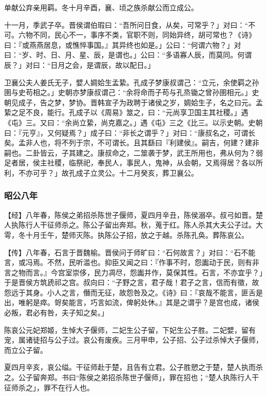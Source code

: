 \documentclass[]{article}
\begin{document}
单献公弃亲用羁。冬十月辛酉，襄、顷之族杀献公而立成公。

十一月，季武子卒。晋侯谓伯瑕曰：``吾所问日食，从矣，可常乎？」对曰：``不可。六物不同，民心不一，事序不类，官职不则，同始异终，胡可常也？《诗》曰：『或燕燕居息，或憔悴事国。』其异终也如是。」公曰：``何谓六物？」对曰：``岁、时、日、月、星、辰，是谓也。」公曰：``多语寡人辰，而莫同。何谓辰？」对曰：``日月之会，是谓辰，故以配日。」

卫襄公夫人姜氏无子，嬖人婤姶生孟絷。孔成子梦康叔谓己：``立元，余使羁之孙圉与史苟相之。」史朝亦梦康叔谓己：``余将命而子苟与孔烝锄之曾孙圉相元。」史朝见成子，告之梦，梦协。晋韩宣子为政聘于诸侯之岁，婤姶生子，名之曰元。孟絷之足不良，能行。孔成子以《周易》筮之，曰：``元尚享卫国主其社稷。」遇《屯》三。又曰：``余尚立絷，尚克嘉之。」遇《屯》三之《比三。以示史朝。史朝曰：『元亨』，又何疑焉？」成子曰：``非长之谓乎？」对曰：``康叔名之，可谓长矣。孟非人也，将不列于宗，不可谓长。且其繇曰『利建侯』。嗣吉，何建？建非嗣也。二卦皆云，子其建之。康叔命之，二筮袭于梦，武王所用也，弗从何为？弱足者居，侯主社稷，临祭祀，奉民人，事民人，鬼神，从会朝，又焉得居？各以所利，不亦可乎？」故孔成子立灵公。十二月癸亥，葬卫襄公。

\hypertarget{header-n2503}{%
\subsubsection{昭公八年}\label{header-n2503}}

【经】八年春，陈侯之弟招杀陈世子偃师，夏四月辛丑，陈侯溺卒。叔弓如晋。楚人执陈行人干征师杀之。陈公子留出奔郑。秋，蒐于红。陈人杀其大夫公子过。大雩，冬十月壬午，楚师灭陈。执陈公子招，放之于越。杀陈孔奂。葬陈哀公。

【传】八年春，石言于晋魏榆。晋侯问于师旷曰：``石何故言？」对曰：``石不能言，或冯焉。不然，民听滥也。抑臣又闻之曰：『作事不时，怨讟动于民，则有非言之物而言。』今宫室崇侈，民力凋尽，怨讟并作，莫保其性。石言，不亦宜乎？」于是晋侯方筑虒祁之宫。叔向曰：``子野之言，君子哉！君子之言，信而有徵，故怨远于其身。小人之言，僭而无征，故怨咎及之。《诗》曰：『哀哉不能言，匪舌是出，唯躬是瘁。哿矣能言，巧言如流，俾躬处休。』其是之谓乎？是宫也成，诸侯必叛，君必有咎，夫子知之矣。」

陈哀公元妃郑姬，生悼大子偃师，二妃生公子留，下妃生公子胜。二妃嬖，留有宠，属诸徒招与公子过。哀公有废疾。三月甲申，公子招、公子过杀悼大子偃师，而立公子留。

夏四月辛亥，哀公缢。干征师赴于楚，且告有立君。公子胜愬之于楚，楚人执而杀之。公子留奔郑。书曰``陈侯之弟招杀陈世子偃师」，罪在招也；``楚人执陈行人干征师杀之」，罪不在行人也。
\end{document}
